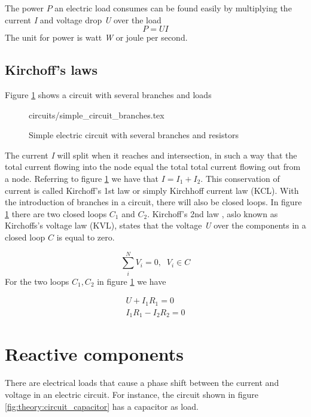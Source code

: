 \documentclass[class=book, crop=false]{standalone}
\begin{document}
The power $P$ an electric load consumes can be found easily by multiplying the current \textit{I} and voltage drop \textit{U} over the load
\begin{equation}\label{eq:theory:apparent_power}
    P = UI
\end{equation}
The unit for power is watt \textit{W} or joule per second.

\subsection{Kirchoff's laws}
Figure \ref{fig:theory:simple_circuit_branches} shows a circuit with several branches and loads 

\begin{figure}[ht!]
    \centering
    {circuits/simple_circuit_branches.tex}
    \caption{Simple electric circuit with several branches and resistors}
    \label{fig:theory:simple_circuit_branches}
\end{figure}

The current \textit{I} will split when it reaches and intersection, in such a way that the total current flowing into the node equal the total total current flowing out from a node. Referring to figure \ref{fig:theory:simple_circuit_branches} we have that $I = I_1 + I_2$. This conservation of current is called Kirchoff's 1st law or simply Kirchhoff current law (KCL). With the introduction of branches in a circuit, there will also be closed loops. In figure \ref{fig:theory:simple_circuit_branches} there are two closed loops $C_{1}$ and $C_{2}$. Kirchoff's 2nd law , aslo known as Kirchoffs's voltage law (KVL), states that the voltage \textit{U} over the components in a closed loop $C$ is equal to zero. 

\begin{equation}\label{eq:theory:kirchoffs_2nd_integral}
    \sum_{i}^{N} V_{i} = 0, \;\; V_{i} \in C
\end{equation}
For the two loops $C_1,C_2$ in figure \ref{fig:theory:simple_circuit_branches} we have 


\begin{equation}
   \begin{aligned}\label{eq:theory:krirchoffs_2nd_ex}
    U + I_{1}R_{1} = 0 
    \\
    I_{1}R_{1} - I_{2}R_{2} = 0
\end{aligned} 
\end{equation}

\section{Reactive components}
There are electrical loads that cause a phase shift between the current and voltage in an electric circuit. For instance, the circuit shown in figure \ref{fig:theory:circuit_capacitor} has a capacitor as load.
\end{document}
